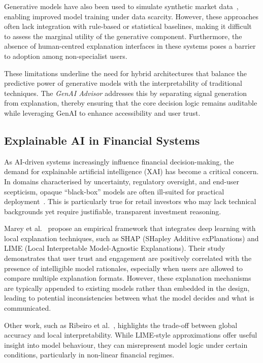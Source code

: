 Generative models have also been used to simulate synthetic market data~\cite{takahashi2024synthetic}, enabling improved model training under data scarcity. However, these approaches often lack integration with rule-based or statistical baselines, making it difficult to assess the marginal utility of the generative component. Furthermore, the absence of human-centred explanation interfaces in these systems poses a barrier to adoption among non-specialist users.

These limitations underline the need for hybrid architectures that balance the predictive power of generative models with the interpretability of traditional techniques. The \textit{GenAI Advisor} addresses this by separating signal generation from explanation, thereby ensuring that the core decision logic remains auditable while leveraging GenAI to enhance accessibility and user trust.

\subsection{Explainable AI in Financial Systems}

As AI-driven systems increasingly influence financial decision-making, the demand for explainable artificial intelligence (XAI) has become a critical concern. In domains characterised by uncertainty, regulatory oversight, and end-user scepticism, opaque “black-box” models are often ill-suited for practical deployment~\cite{gunning2019xai}. This is particularly true for retail investors who may lack technical backgrounds yet require justifiable, transparent investment reasoning.

Marey et al.~\cite{marey2024xai} propose an empirical framework that integrates deep learning with local explanation techniques, such as SHAP (SHapley Additive exPlanations) and LIME (Local Interpretable Model-Agnostic Explanations). Their study demonstrates that user trust and engagement are positively correlated with the presence of intelligible model rationales, especially when users are allowed to compare multiple explanation formats. However, these explanation mechanisms are typically appended to existing models rather than embedded in the design, leading to potential inconsistencies between what the model decides and what is communicated.

Other work, such as Ribeiro et al.~\cite{ribeiro2016lime}, highlights the trade-off between global accuracy and local interpretability. While LIME-style approximations offer useful insight into model behaviour, they can misrepresent model logic under certain conditions, particularly in non-linear financial regimes.

